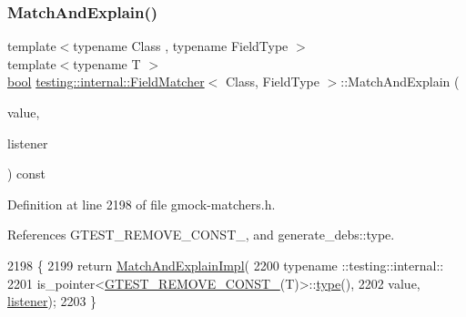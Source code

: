 \mbox{\label{classtesting_1_1internal_1_1FieldMatcher_ac0cf950415d64026bc28eb84e6296f1b}} 
\subsubsection{\texorpdfstring{Match\+And\+Explain()}{MatchAndExplain()}}
{\footnotesize\ttfamily template$<$typename Class , typename Field\+Type $>$ \\
template$<$typename T $>$ \\
\hyperlink{classbool}{bool} \hyperlink{classtesting_1_1internal_1_1FieldMatcher}{testing\+::internal\+::\+Field\+Matcher}$<$ Class, Field\+Type $>$\+::Match\+And\+Explain (\begin{DoxyParamCaption}\item[{const T \&}]{value,  }\item[{\hyperlink{classtesting_1_1MatchResultListener}{Match\+Result\+Listener} $\ast$}]{listener }\end{DoxyParamCaption}) const\hspace{0.3cm}{\ttfamily [inline]}}



Definition at line 2198 of file gmock-\/matchers.\+h.



References G\+T\+E\+S\+T\+\_\+\+R\+E\+M\+O\+V\+E\+\_\+\+C\+O\+N\+S\+T\+\_\+, and generate\+\_\+debs\+::type.


\begin{DoxyCode}
2198                                                                             \{
2199     \textcolor{keywordflow}{return} \hyperlink{classtesting_1_1internal_1_1FieldMatcher_a3ac8072e68a33f78531d7b1eff96810c}{MatchAndExplainImpl}(
2200         typename ::testing::internal::
2201             is\_pointer<\hyperlink{gtest-internal_8h_a2ffec8c60510eb130af387f5ce9a756a}{GTEST\_REMOVE\_CONST\_}(T)>::\hyperlink{namespacegenerate__debs_a50bc9a7ecac9584553e089a448bcde58}{type}(),
2202         value, \hyperlink{namespaceinteractive__marker_a0e579ab555212bb5e2c9f8a675b7618a}{listener});
2203   \}
\end{DoxyCode}
\mbox{\label{classtesting_1_1internal_1_1FieldMatcher_a3ac8072e68a33f78531d7b1eff96810c}} 
